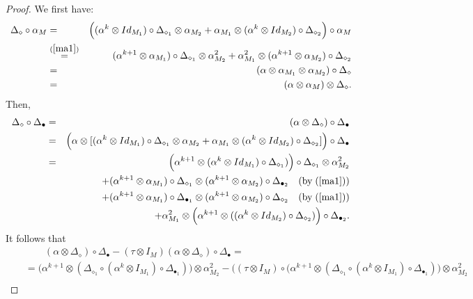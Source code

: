\documentclass{article}
\theoremstyle{definition}
\theoremstyle{remark}
\numberwithin{equation}{section}
\begin{document}
\begin{proof}
We first have:
\begin{eqnarray}
\Delta_\diamond\circ \alpha_M
&=&\Big((\alpha^k\otimes Id_{M_1})\circ\Delta_{\diamond_1} \otimes\alpha_{M_2}+    \alpha_{M_1}\otimes(\alpha^k\otimes Id_{M_2})\circ\Delta_{\diamond_2}  \Big)\circ\alpha_M\nonumber\\
&\stackrel{(\ref{ma1})}{=}&(\alpha^{k+1}\otimes \alpha_{M_1})\circ\Delta_{\diamond_1} \otimes\alpha^2_{M_2}+    \alpha^2_{M_1}\otimes(\alpha^{k+1}\otimes  \alpha_{M_2})\circ\Delta_{\diamond_2}\nonumber\\
&=&(\alpha\otimes\alpha_{M_1}\otimes\alpha_{M_2})\circ\Delta_\diamond\nonumber\\
&=&(\alpha\otimes\alpha_{M})\otimes\Delta_\diamond\nonumber.
\end{eqnarray}
Then,
  \begin{eqnarray}
   \Delta_\diamond\circ\Delta_\bullet
&=&(\alpha\otimes\Delta_\diamond)\circ\Delta_\bullet\nonumber\\
&=&\Big(\alpha\otimes[(\alpha^k\otimes Id_{M_1})\circ\Delta_{\diamond_1} \otimes\alpha_{M_2}+    \alpha_{M_1}\otimes(\alpha^k\otimes Id_{M_2})\circ\Delta_{\diamond_2}]\Big)\circ\Delta_\bullet\nonumber\\
&=&\Big(\alpha^{k+1}\otimes(\alpha^k\otimes Id_{M_1})\circ\Delta_{\diamond_1})\Big)\circ\Delta_{\diamond_1} \otimes\alpha^2_{M_2}\nonumber\\
&&+(\alpha^{k+1}\otimes\alpha_{M_1})\circ\Delta_{\diamond_1}\otimes(\alpha^{k+1}\otimes\alpha_{M_2})\circ\Delta_{\bullet_2}\quad(\mbox{by} \;(\ref{ma1}))\nonumber\\
&&+(\alpha^{k+1}\otimes\alpha_{M_1})\circ\Delta_{\bullet_1}\otimes(\alpha^{k+1}\otimes\alpha_{M_2})\circ\Delta_{\diamond_2}\quad(\mbox{by} \;(\ref{ma1}))\nonumber\\
&&+\alpha^2_{M_1}\otimes\Big(\alpha^{k+1}\otimes((\alpha^k\otimes Id_{M_2})\circ\Delta_{\diamond_2})\Big)\circ\Delta_{\bullet_2}\nonumber.
  \end{eqnarray}
It follows that
\begin{eqnarray}
 &&\qquad(\alpha\otimes\Delta_\diamond)\circ\Delta_\bullet-(\tau\otimes I_{M})(\alpha\otimes\Delta_\diamond)\circ\Delta_\bullet=\nonumber\\
&&=\Big(\alpha^{k+1}\otimes(\Delta_{\diamond_1}\circ(\alpha^k\otimes I_{M_1})\circ\Delta_{\bullet_1})\Big)\otimes\alpha^2_{M_2}
-\Big((\tau\otimes I_{M})\circ(\alpha^{k+1}\otimes(\Delta_{\diamond_1}\circ(\alpha^k\otimes I_{M_1})\circ\Delta_{\bullet_1})\Big)\otimes\alpha^2_{M_2}\nonumber\\

\end{eqnarray}
\end{proof}
\end{document}
